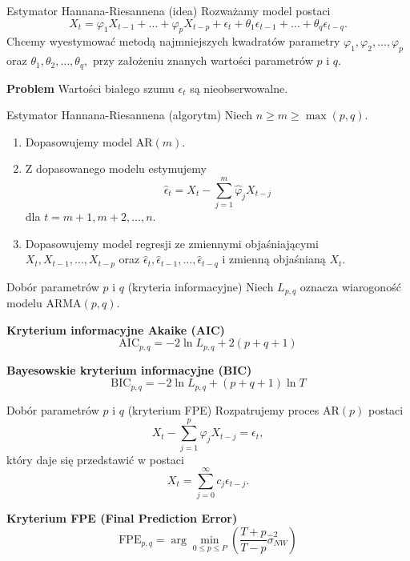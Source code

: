 \documentclass[a4paper, 11pt]{beamer}
\begin{document}
	\begin{frame}{Estymator Hannana-Riesannena (idea)}
		Rozważamy model postaci \[
			X_{t} = \varphi_{1} X_{t-1} + \ldots + \varphi_{p} X_{t-p}
				+ \epsilon_{t} + \theta_{1} \epsilon_{t-1} + \ldots + \theta_{q} \epsilon_{t-q}.
		\] Chcemy wyestymować metodą najmniejszych kwadratów parametry $\varphi_{1}, \varphi_{2}, \ldots, \varphi_{p}$ oraz $\theta_{1},
		\theta_{2}, \ldots, \theta_{q},$ przy założeniu znanych wartości parametrów $p$ i $q.$
		\begin{center}
			\begin{alert}{\textbf{Problem}}
				Wartości białego szumu $\epsilon_{t}$ są nieobserwowalne.
			\end{alert}		
		\end{center}
	\end{frame}
	
	\begin{frame}{Estymator Hannana-Riesannena (algorytm)}
		Niech $n \geq m \geq \max\left(p, q\right).$
		\begin{enumerate}
			\item Dopasowujemy model $\mbox{AR}\left(m\right).$
			\item Z dopasowanego modelu estymujemy \[
				\hat{\epsilon}_{t} = X_{t} - \sum_{j=1}^{m} \hat{\varphi}_{j} X_{t-j}
			\] dla $t = m + 1, m + 2, \ldots, n.$
			\item Dopasowujemy model regresji ze zmiennymi objaśniającymi $X_t, X_{t-1}, \ldots, X_{t-p}$ oraz
				$\hat{\epsilon}_{t}, \hat{\epsilon}_{t-1}, \ldots, \hat{\epsilon}_{t-q}$ i zmienną objaśnianą $X_{t}.$
		\end{enumerate}
	\end{frame}
	
	\begin{frame}{Dobór parametrów $p$ i $q$ (kryteria informacyjne)}
		Niech $L_{p,q}$ oznacza wiarogoność modelu $\mbox{ARMA}\left(p, q\right).$
		\begin{block}{\textbf{Kryterium informacyjne Akaike (AIC)}}
			\[
				\mbox{AIC}_{p,q} = -2\ln L_{p,q} + 2\left(p + q + 1\right)
			\]
		\end{block}
		\begin{block}{\textbf{Bayesowskie kryterium informacyjne (BIC)}}
			\[
				\mbox{BIC}_{p,q} = -2\ln L_{p,q} + \left(p + q + 1\right) \ln T
			\]
		\end{block}
	\end{frame}
	
	\begin{frame}{Dobór parametrów $p$ i $q$ (kryterium FPE)}
		Rozpatrujemy proces $\mbox{AR}\left(p\right)$ postaci \[
			X_{t} - \sum_{j=1}^{p} \varphi_{j} X_{t - j} = \epsilon_{t},
		\] który daje się przedstawić w postaci \[
			X_{t} = \sum_{j = 0}^{\infty} c_{j} \epsilon_{t - j}.
		\]
		\begin{block}{\textbf{Kryterium FPE (Final Prediction Error)}}
			\[
				\mbox{FPE}_{p,q} = \arg\min_{0\leq p \leq P} \left(\frac{T + p}{T - p} \hat{\sigma}_{NW}^{2}\right)
			\]
		\end{block}
	\end{frame}
	
\end{document}
